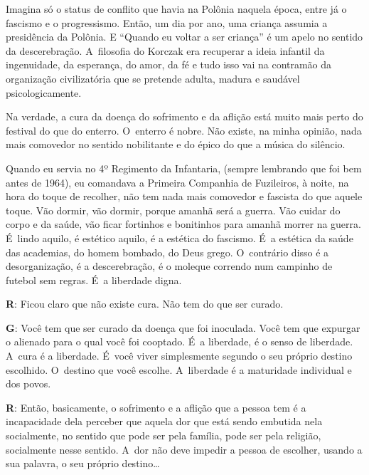  

Imagina só o status de conflito que havia na Polônia naquela época,
entre já o fascismo e o progressismo. Então, um dia por ano, uma criança
assumia a presidência da Polônia. E ``Quando eu voltar a ser criança'' é
um apelo no sentido da descerebração. A~filosofia do Korczak era
recuperar a ideia infantil da ingenuidade, da esperança, do amor, da fé
e tudo isso vai na contramão da organização civilizatória que se
pretende adulta, madura e saudável psicologicamente.

 

Na verdade, a cura da doença do sofrimento e da aflição está muito mais
perto do festival do que do enterro. O~enterro é nobre. Não existe, na
minha opinião, nada mais comovedor no sentido nobilitante e do épico do
que a música do silêncio.

 

Quando eu servia no 4º Regimento da Infantaria, (sempre lembrando que
foi bem antes de 1964), eu comandava a Primeira Companhia de Fuzileiros,
à noite, na hora do toque de recolher, não tem nada mais comovedor e
fascista do que aquele toque. Vão dormir, vão dormir, porque amanhã será
a guerra. Vão cuidar do corpo e da saúde, vão ficar fortinhos e
bonitinhos para amanhã morrer na guerra. É~lindo aquilo, é estético
aquilo, é a estética do fascismo. É~a estética da saúde das academias,
do homem bombado, do Deus grego. O~contrário disso é a desorganização, é
a descerebração, é o moleque correndo num campinho de futebol sem
regras. É~a liberdade digna.

 

\textbf{R}: Ficou claro que não existe cura. Não tem do que ser curado.

 

\textbf{G}: Você tem que ser curado da doença que foi inoculada. Você
tem que expurgar o alienado para o qual você foi cooptado. É~a
liberdade, é o senso de liberdade. A~cura é a liberdade. É~você viver
simplesmente segundo o seu próprio destino escolhido. O~destino que você
escolhe. A~liberdade é a maturidade individual e dos povos.

 

\textbf{R}: Então, basicamente, o sofrimento e a aflição que a pessoa tem
é a incapacidade dela perceber que aquela dor que está sendo embutida
nela socialmente, no sentido que pode ser pela família, pode ser pela
religião, socialmente nesse sentido. A~dor não deve impedir a pessoa de
escolher, usando a sua palavra, o seu próprio destino…


